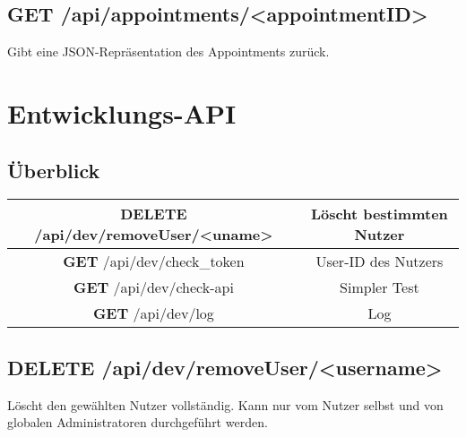 \documentclass[11pt,a4paper]{article}
\begin{document}
\subsection{\textbf{GET} /api/appointments/<appointmentID>}
Gibt eine JSON-Repräsentation des Appointments zurück.

\section{Entwicklungs-API}
\subsection{Überblick}

\begin{tabular}{|c|c|}
\hline
\textbf{DELETE} /api/dev/removeUser/<uname> & Löscht bestimmten Nutzer \\
\hline
\textbf{GET} /api/dev/check\_token & User-ID des Nutzers \\
\hline
\textbf{GET} /api/dev/check-api & Simpler Test \\
\hline
\textbf{GET} /api/dev/log & Log \\
\hline
\end{tabular}

\subsection{\textbf{DELETE} /api/dev/removeUser/<username>}
Löscht den gewählten Nutzer vollständig. Kann nur vom Nutzer selbst und von globalen Administratoren durchgeführt werden.
\end{document}
